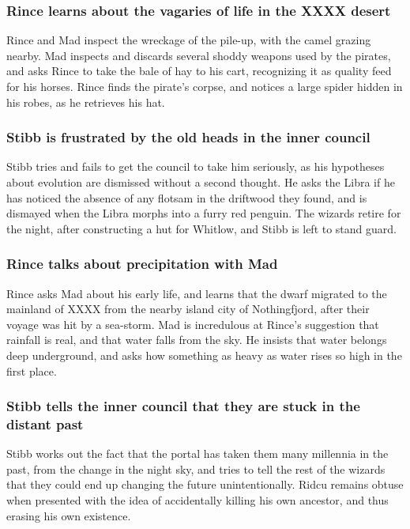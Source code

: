 \subsubsection{\Gls{Rince} learns about the vagaries of life in the XXXX desert}
\Gls{Rince} and \Gls{Mad} inspect the wreckage of the pile-up, with the camel grazing nearby.
\Gls{Mad} inspects and discards several shoddy weapons used by the pirates, and asks \Gls{Rince}
to take the bale of hay to his cart, recognizing it as quality feed for his horses. \Gls{Rince}
finds the pirate's corpse, and notices a large spider hidden in his robes, as he retrieves his
hat.

\subsubsection{\Gls{Stibb} is frustrated by the old heads in the inner council}
\Gls{Stibb} tries and fails to get the council to take him seriously, as his hypotheses about
evolution are dismissed without a second thought. He asks the \Gls{Libra} if he has noticed the
absence of any flotsam in the driftwood they found, and is dismayed when the \Gls{Libra} morphs
into a furry red penguin. The wizards retire for the night, after constructing a hut for
\Gls{Whitlow}, and \Gls{Stibb} is left to stand guard.

\subsubsection{\Gls{Rince} talks about precipitation with \Gls{Mad}}
\Gls{Rince} asks \Gls{Mad} about his early life, and learns that the dwarf migrated to the mainland
of XXXX from the nearby island city of Nothingfjord, after their voyage was hit by a sea-storm.
\Gls{Mad} is incredulous at \Gls{Rince}'s suggestion that rainfall is real, and that water falls
from the sky. He insists that water belongs deep underground, and asks how something as heavy as
water rises so high in the first place.

\subsubsection{\Gls{Stibb} tells the inner council that they are stuck in the distant past}
\Gls{Stibb} works out the fact that the portal has taken them many millennia in the past, from the
change in the night sky, and tries to tell the rest of the wizards that they could end up changing
the future unintentionally. \Gls{Ridcu} remains obtuse when presented with the idea of accidentally
killing his own ancestor, and thus erasing his own existence.

